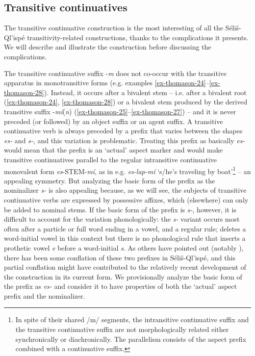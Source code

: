 \documentclass[output=paper,colorlinks,citecolor=brown]{langscibook}
\begin{document}
\subsection{Transitive continuatives}  %
\label{thomason_section_2.6}

The transitive continuative construction is the most interesting of
all the S\'eli\v{s}-Ql'isp\'e transitivity-related constructions,
thanks to the complications it presents.  We will describe and
illustrate the construction before discussing the complications.

The transitive continuative suffix -\emph{m} does not co-occur with
the transitive apparatus in monotransitive forms (e.g.  examples \ref{ex-thomason-24}--\ref{ex-thomason-28}).
Instead, it occurs after a bivalent stem -- i.e. after a bivalent root
(\ref{ex-thomason-24}, \ref{ex-thomason-28}) or a bivalent stem produced by the derived transitive suffix
-\emph{m\'i}(\emph{n}) (\ref{ex-thomason-25}--\ref{ex-thomason-27}) -- and it is never preceded (or
followed) by an object suffix or an agent suffix.  A transitive
continuative verb is always preceded by a prefix that varies between
the shapes \emph{es-} and \emph{s-}, and this variation is
problematic.  Treating this prefix as basically \emph{es-} would mean
that the prefix is an `actual' aspect marker and would make transitive
continuatives parallel to the regular intransitive continuative
monovalent form \emph{es}-STEM-\emph{m\'i}, as in
e.g. \emph{es-lap-m\'i} `s/he's traveling by boat'\footnote{In spite
of their shared /m/ segments, the intransitive continuative suffix and
the transitive continuative suffix are not morphologically related
either synchronically or diachronically. The parallelism consists of
the aspect prefix combined with a continuative suffix.  } -- an
appealing symmetry.  But analyzing the basic form of the prefix as the
nominalizer \emph{s-} is also appealing because, as we will see, the
subjects of transitive continuative verbs are expressed by possessive
affixes, which (elsewhere) can only be added to nominal stems.  If the
basic form of the prefix is \emph{s-}, however, it is difficult to
account for the variation phonologically: the \emph{s-} variant occurs
most often after a particle or full word ending in a vowel, and a
regular rule; deletes a word-initial vowel in this context but there
is no phonological rule that inserts a prothetic vowel \emph{e} before
a word-initial \emph{s}.  As others have pointed out (notably
\citealt{Kroeber:1999}), there has been some conflation of these two
prefixes in S\'eli\v{s}-Ql'isp\'e, and this partial conflation might
have contributed to the relatively recent development of the
construction in its current form.  We provisionally analyze the basic
form of the prefix as \emph{es-} and consider it to have properties of
both the `actual' aspect prefix and the nominalizer.
\end{document}
